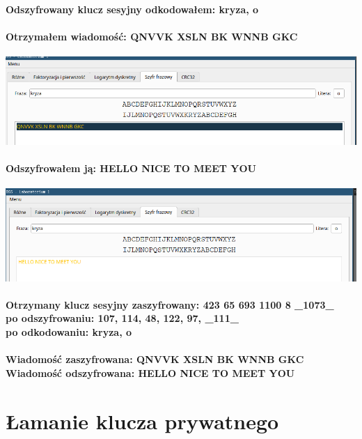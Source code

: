 \documentclass{article}[12pt]
\begin{document}
\paragraph{Odszyfrowany klucz sesyjny odkodowałem: kryza, o}
\paragraph{Otrzymałem wiadomość: QNVVK XSLN BK WNNB GKC \\ } 
\includegraphics[width=1\textwidth]{eight.png} 
\paragraph{Odszyfrowałem ją: HELLO NICE TO MEET YOU \\}
\includegraphics[width=1\textwidth]{nine.png}
\paragraph{Otrzymany klucz sesyjny zaszyfrowany: 423 65 693 1100 8 \_1073\_ \\ po odszyfrowaniu: 107, 114, 48, 122, 97, \_111\_ \\ po odkodowaniu: kryza, o }
\paragraph{Wiadomość zaszyfrowana: QNVVK XSLN BK WNNB GKC \\ Wiadomość odszyfrowana: HELLO NICE TO MEET YOU}
\section{Łamanie klucza prywatnego}
\end{document}
